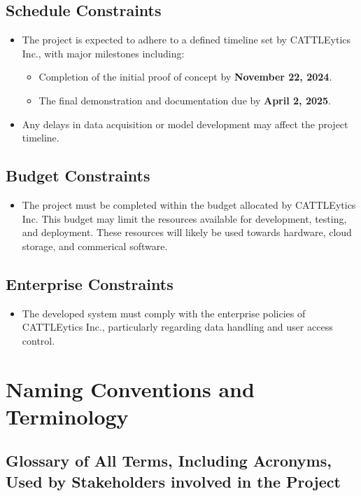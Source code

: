 \documentclass[12pt]{article}
\begin{document}
\subsection{Schedule Constraints}
\begin{itemize}
    \item The project is expected to adhere to a defined timeline set by 
    CATTLEytics Inc., with major milestones including:
    \begin{itemize}
        \item Completion of the initial proof of concept by \textbf{November 
        22, 2024}.
        \item The final demonstration and documentation due by \textbf{April 2, 
        2025}.
    \end{itemize}
    \item Any delays in data acquisition or model development may affect the 
    project timeline.
\end{itemize}

\subsection{Budget Constraints}
\begin{itemize}
    \item The project must be completed within the budget allocated by 
    CATTLEytics Inc. This budget may limit the resources available for 
    development, testing, and deployment. These resources will likely be used 
    towards hardware, cloud storage, and commerical software. 
\end{itemize}

\subsection{Enterprise Constraints}
\begin{itemize}
    \item The developed system must comply with the enterprise policies of 
    CATTLEytics Inc., particularly regarding data handling and user access 
    control.
\end{itemize}


\section{Naming Conventions and Terminology}
\subsection{Glossary of All Terms, Including Acronyms, Used by Stakeholders
involved in the Project}
\end{document}
